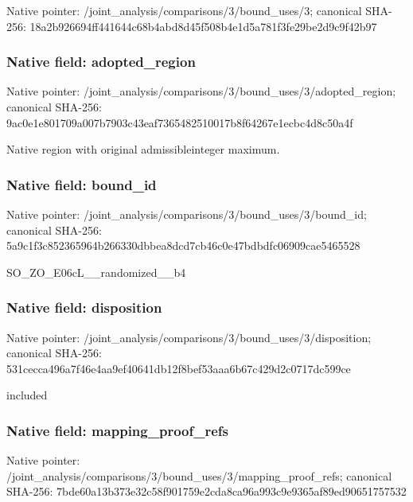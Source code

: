 \documentclass[10pt,a4paper]{article}
\begin{document}
Native pointer: /joint\_analysis/comparis\allowbreak{}ons/3/bound\_uses/3; canonical SHA-256: 18a2b926694ff441644c68b4\allowbreak{}abd8d45f508b4e1d5a781f3f\allowbreak{}e29be2d9c9f42b97



\subsubsection{Native field: adopted\_region}


Native pointer: /joint\_analysis/comparis\allowbreak{}ons/3/bound\_uses/3/adopt\allowbreak{}ed\_region; canonical SHA-256: 9ac0e1e801709a007b7903c4\allowbreak{}3eaf7365482510017b8f6426\allowbreak{}7e1ecbc4d8c50a4f


Native region with original admissibleinteger maximum.


\subsubsection{Native field: bound\_id}


Native pointer: /joint\_analysis/comparis\allowbreak{}ons/3/bound\_uses/3/bound\allowbreak{}\_id; canonical SHA-256: 5a9c1f3c852365964b266330\allowbreak{}dbbea8dcd7cb46c0e47bdbdf\allowbreak{}c06909cae5465528


SO\_ZO\_E06cL\_\_randomized\_\_b4


\subsubsection{Native field: disposition}


Native pointer: /joint\_analysis/comparis\allowbreak{}ons/3/bound\_uses/3/dispo\allowbreak{}sition; canonical SHA-256: 531cecca496a7f46e4aa9ef4\allowbreak{}0641db12f8bef53aaa6b67c4\allowbreak{}29d2c0717dc599ce


included


\subsubsection{Native field: mapping\_proof\_refs}


Native pointer: /joint\_analysis/comparis\allowbreak{}ons/3/bound\_uses/3/mappi\allowbreak{}ng\_proof\_refs; canonical SHA-256: 7bde60a13b373e32c58f9017\allowbreak{}59e2cda8ca96a993c9e9365a\allowbreak{}f89ed90651757532
\end{document}
